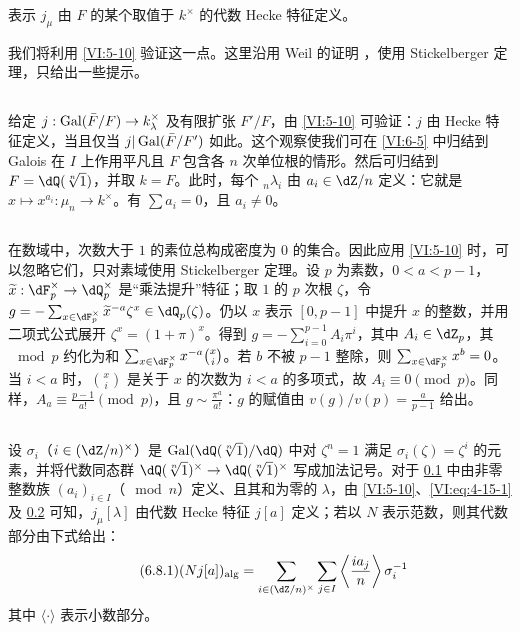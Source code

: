 \begin{theorem_}\label{VI:6-5}
表示 $j_\mu$ 由 $F$ 的某个取值于 $k^\times$ 的代数 Hecke 特征定义。
\end{theorem_}

我们将利用 \ref{VI:5-10} 验证这一点。这里沿用 Weil 的证明 \cite{we52,we74-2}，使用 Stickelberger 定理，只给出一些提示。

\subsection{}\label{VI:6-6}

给定 $j:\operatorname{Gal}(\bar F/F) \to k_\lambda^\times$ 及有限扩张 $F'/F$，由 \ref{VI:5-10} 可验证：$j$ 由 Hecke 特征定义，当且仅当 $j|\operatorname{Gal}(\bar F/F')$ 如此。这个观察使我们可在 \ref{VI:6-5} 中归结到 Galois 在 $I$ 上作用平凡且 $F$ 包含各 $n$ 次单位根的情形。然后可归结到 $F=\dQ(\sqrt[n]{1})$，并取 $k=F$。此时，每个 $_n \lambda_i$ 由 $a_i\in \dZ/n$ 定义：它就是 $x\mapsto x^{a_i}:\mu_n \to k^\times$。有 $\sum a_i=0$，且 $a_i\ne 0$。

\subsection{}\label{VI:6-7}

在数域中，次数大于 $1$ 的素位总构成密度为 $0$ 的集合。因此应用 \ref{VI:5-10} 时，可以忽略它们，只对素域使用 Stickelberger 定理。设 $p$ 为素数，$0<a<p-1$，$\widetilde x:\dF_p^\times \to \dQ_p^\times$ 是“乘法提升”特征；取 $1$ 的 $p$ 次根 $\zeta$，令 $g=-\sum_{x\in \dF_p^\times} \widetilde x^{-a} \zeta^x\in \dQ_p(\zeta)$。仍以 $x$ 表示 $[0,p-1]$ 中提升 $x$ 的整数，并用二项式公式展开 $\zeta^x=(1+\pi)^x$。得到 $g=-\sum_{i=0}^{p-1} A_i\pi^i$，其中 $A_i\in \dZ_p$，其 $\mod p$ 约化为和 $\sum_{x\in \dF_p^\times} x^{-a} \binom x i$。若 $b$ 不被 $p-1$ 整除，则 $\sum_{x\in \dF_p^\times} x^b=0$。当 $i<a$ 时，$\binom x i$ 是关于 $x$ 的次数为 $i<a$ 的多项式，故 $A_i\equiv 0\pmod p$。同样，$A_a\equiv \frac{p-1}{a!} \pmod p$，且 $g\sim \frac{\pi^a}{a!}$：$g$ 的赋值由 $v(g)/v(p) = \frac{a}{p-1}$ 给出。

\subsection{}\label{VI:6-8}

设 $\sigma_i$（$i\in (\dZ/n)^\times$）是 $\gal(\dQ(\sqrt[n]{1})/\dQ)$ 中对 $\zeta^n=1$ 满足 $\sigma_i(\zeta)=\zeta^i$ 的元素，并将代数同态群 $\dQ(\sqrt[n]{1})^\times \to \dQ(\sqrt[n]{1})^\times$ 写成加法记号。对于 \ref{VI:6-6} 中由非零整数族 $(a_i)_{i\in I}$（$\mod n$）定义、且其和为零的 $\lambda$，由 \ref{VI:5-10}、\eqref{VI:eq:4-15-1} 及 \ref{VI:6-7} 可知，$j_\mu[\lambda]$ 由代数 Hecke 特征 $j[a]$ 定义；若以 $N$ 表示范数，则其代数部分由下式给出：
\begin{equation*}\tag{6.8.1}\label{VI:eq:6-8-1}
  (N j[a])_\text{alg} = \sum_{i\in (\dZ/n)^\times} \sum_{j\in I} \left\langle \frac{i a_j}{n} \right\rangle \sigma_i^{-1}
\end{equation*}
其中 $\langle \cdot \rangle$ 表示小数部分。

